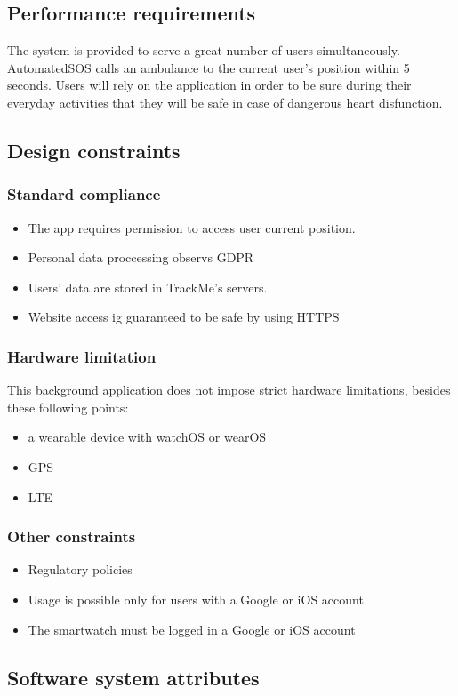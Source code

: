 \documentclass{article}
\begin{document}
\subsection{Performance requirements}
The system is provided to serve a great number of users simultaneously. AutomatedSOS calls an ambulance to the current user's position within 5 seconds. Users will rely on the application in order to be sure during their everyday activities that they will be safe in case of dangerous heart disfunction.
\subsection{Design constraints}
\subsubsection{Standard compliance}
\begin{itemize}
\item The app requires permission to access user current position.
\item Personal data proccessing observs GDPR
\item Users' data are stored in TrackMe's servers.
\item Website access ig guaranteed to be safe by using HTTPS
\end{itemize}
\subsubsection{Hardware limitation}
This background application does not impose strict hardware limitations, besides these following points:
\begin{itemize}
\item a wearable device with watchOS or wearOS
\item GPS
\item LTE
\end{itemize}
\subsubsection{Other constraints}
\begin{itemize}
\item Regulatory policies
\item Usage is possible only for users with a Google or iOS account
\item The smartwatch must be logged in a Google or iOS account
\end{itemize}
\subsection{Software system attributes}
\end{document}
